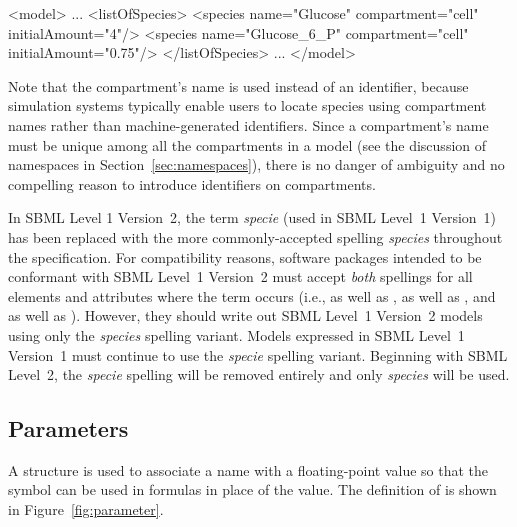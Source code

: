 \documentclass[10pt]{cekarticle}
\newcommand{\vref}[1]{\ref{#1}}
\newcommand{\changed}[1]{\textcolor{BrickRed}{#1}}
\newenvironment{blockChanged}{\color{BrickRed}}{}
\begin{document}
\begin{example}
<model>
    ...
    <listOfSpecies>
        <species name="Glucose" compartment="cell" initialAmount="4"/>
        <species name="Glucose_6_P" compartment="cell" initialAmount="0.75"/>
    </listOfSpecies>
    ...
</model>

\end{example}

Note that the compartment's name is used instead of an identifier, because
simulation systems typically enable users to locate species using
compartment names rather than machine-generated identifiers.  Since a
compartment's name must be unique among all the compartments in a model
(see the discussion of namespaces in Section~\ref{sec:namespaces}), there
is no danger of ambiguity and no compelling reason to introduce identifiers
on compartments.

\begin{blockChanged}
  In SBML Level 1 Version~2, the term \emph{specie} (used in SBML Level~1
  Version~1) has been replaced with the more commonly-accepted spelling
  \emph{species} throughout the specification.  For compatibility reasons,
  software packages intended to be conformant with SBML Level~1 Version~2
  must accept \emph{both} spellings for all elements and attributes where
  the term occurs (i.e.,  as well as ,
   as well as , and
   as well as
  ).  However, they should write out SBML
  Level~1 Version~2 models using only the \emph{species} spelling variant.
  Models expressed in SBML Level~1 Version~1 must continue to use the
  \emph{specie} spelling variant.  Beginning with SBML Level~2, the
  \emph{specie} spelling will be removed entirely and only \emph{species}
  will be used.
\end{blockChanged}


\subsection{Parameters}
\label{sec:parameters}

A  structure is used to associate a \changed{name} with a
floating-point value so that the symbol can be used in formulas in place of
the value.  The definition of  is shown in
Figure~\vref{fig:parameter}.
\end{document}
